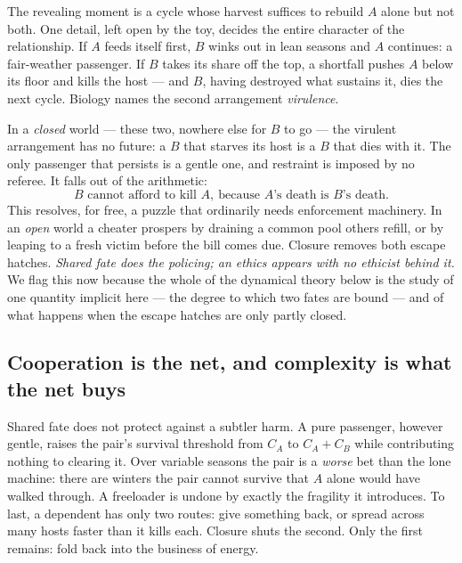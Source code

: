 \documentclass[11pt]{article}
\theoremstyle{plain}
\theoremstyle{definition}
\begin{document}
The revealing moment is a cycle whose harvest suffices to rebuild $A$ alone but not both. One detail, left open by the toy, decides the entire character of the relationship. If $A$ feeds itself first, $B$ winks out in lean seasons and $A$ continues: a fair-weather passenger. If $B$ takes its share off the top, a shortfall pushes $A$ below its floor and kills the host --- and $B$, having destroyed what sustains it, dies the next cycle. Biology names the second arrangement \emph{virulence}.

In a \emph{closed} world --- these two, nowhere else for $B$ to go --- the virulent arrangement has no future: a $B$ that starves its host is a $B$ that dies with it. The only passenger that persists is a gentle one, and restraint is imposed by no referee. It falls out of the arithmetic:
\[
B \text{ cannot afford to kill } A,\ \text{because } A\text{'s death is } B\text{'s death.}
\]
This resolves, for free, a puzzle that ordinarily needs enforcement machinery. In an \emph{open} world a cheater prospers by draining a common pool others refill, or by leaping to a fresh victim before the bill comes due. Closure removes both escape hatches. \emph{Shared fate does the policing; an ethics appears with no ethicist behind it.} We flag this now because the whole of the dynamical theory below is the study of one quantity implicit here --- the degree to which two fates are bound --- and of what happens when the escape hatches are only partly closed.

\subsection{Cooperation is the net, and complexity is what the net buys}

Shared fate does not protect against a subtler harm. A pure passenger, however gentle, raises the pair's survival threshold from $C_A$ to $C_A + C_B$ while contributing nothing to clearing it. Over variable seasons the pair is a \emph{worse} bet than the lone machine: there are winters the pair cannot survive that $A$ alone would have walked through. A freeloader is undone by exactly the fragility it introduces. To last, a dependent has only two routes: give something back, or spread across many hosts faster than it kills each. Closure shuts the second. Only the first remains: fold back into the business of energy.
\end{document}
